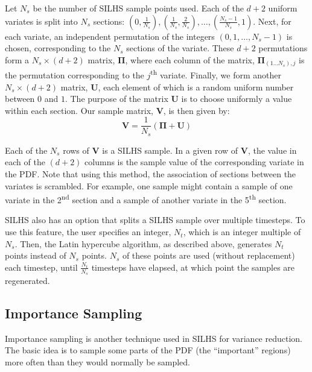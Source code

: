 \documentclass[11pt,fleqn]{article}
\begin{document}
Let $N_s$ be the number of SILHS sample points used. Each of the $d+2$ uniform
variates is split into $N_s$ sections: $\left(0,\frac{1}{N_s}\right),
\left(\frac{1}{N_s},\frac{2}{N_s}\right), \ldots,
\left(\frac{N_s-1}{N_s},1\right)$. Next, for each variate, an independent
permutation of the integers $\left(0,1,\ldots,N_s-1\right)$ is chosen,
corresponding to the $N_s$ sections of the variate. These $d+2$ permutations
form a $N_s\times \left(d+2\right)$ matrix, $\bm{\Pi}$, where each column of the
matrix, $\bm{\Pi}_{\left(1\ldots N_s\right),j}$ is the permutation corresponding
to the $j$\textsuperscript{th} variate. Finally, we form another $N_s\times
\left(d+2\right)$ matrix, $\mathbf{U}$, each element of which is a random
uniform number between $0$ and $1$. The purpose of the matrix $\mathbf{U}$ is to
choose uniformly a value within each section. Our sample matrix, $\mathbf{V}$,
is then given by: 
\begin{equation}
\mathbf{V} = \frac{1}{N_s}\left(\bm{\Pi} + \mathbf{U}\right)
\end{equation}

Each of the $N_s$ rows of $\mathbf{V}$ is a SILHS sample. In a given row of
$\mathbf{V}$, the value in each of the $\left(d+2\right)$ columns is the sample
value of the corresponding variate in the PDF. Note that using this method, the
association of sections between the variates is scrambled. For example, one
sample might contain a sample of one variate in the 2\textsuperscript{nd}
section and a sample of another variate in the 5\textsuperscript{th} section.

SILHS also has an option that splits a SILHS sample over multiple timesteps. To
use this feature, the user specifies an integer, $N_t$, which is an integer
multiple of $N_s$. Then, the Latin hypercube algorithm, as described above,
generates $N_t$ points instead of $N_s$ points. $N_s$ of these points are
used (without replacement) each timestep, until $\frac{N_t}{N_s}$ timesteps have
elapsed, at which point the samples are regenerated.

\subsection{Importance Sampling}

Importance sampling is another technique used in SILHS for variance reduction.
The basic idea is to sample some parts of the PDF (the ``important'' regions)
more often than they would normally be sampled.
\end{document}
